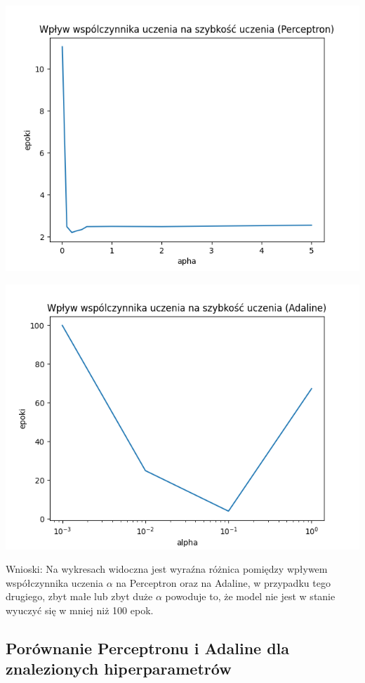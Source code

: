 \documentclass{article}
\begin{document}
\begin{center}
\includegraphics[scale=0.7]{per_exp3.png}
\end{center}
\begin{center}
\includegraphics[scale=0.7]{ada_exp2.png}
\end{center}
Wnioski: Na wykresach widoczna jest wyraźna różnica pomiędzy wpływem współczynnika uczenia $\alpha$ na Perceptron oraz na Adaline, w przypadku tego drugiego, zbyt małe lub zbyt duże $\alpha$ powoduje to, że model nie jest w stanie wyuczyć się w mniej niż 100 epok.

\newpage
\subsection{Porównanie Perceptronu i Adaline dla znalezionych hiperparametrów}
\end{document}
